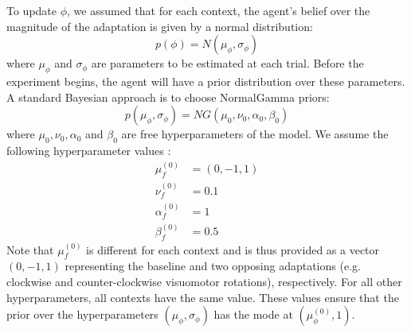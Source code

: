 \documentclass[a4paper,doc,floatsintext,natbib]{apa6}
\begin{document}
To update $\phi$, we assumed that for each context, the agent's belief over
the magnitude of the adaptation is given by a normal distribution:
\begin{equation}
p(\phi) = N(\mu_\phi, \sigma_\phi) \label{eqn:data-dist}
\end{equation}
where $\mu_\phi$ and $\sigma_\phi$ are parameters to be estimated at each
trial. Before the experiment begins, the agent will have a prior distribution
over these parameters. A standard Bayesian approach is to choose NormalGamma
priors:
\begin{equation}
p(\mu_\phi, \sigma_\phi) = NG(\mu_0, \nu_0, \alpha_0, \beta_0)
\end{equation}
where $\mu_0, \nu_0, \alpha_0$ and $\beta_0$ are free hyperparameters of the
model. We assume the following hyperparameter values :
\begin{align} \mu_f^{(0)} &= (0, -1, 1) \\
  \nu_f^{(0)} &= 0.1 \\
  \alpha_f^{(0)} &= 1 \\
  \beta_f^{(0)} &= 0.5
\end{align}
Note that $\mu_f^{(0)}$ is different for each context and is thus provided as a
vector $(0, -1, 1)$ representing the baseline and two opposing adaptations
(e.g. clockwise and counter-clockwise visuomotor rotations), respectively. For
all other hyperparameters, all contexts have the same value. These values
ensure that the prior over the hyperparameters $(\mu_\phi, \sigma_\phi)$ has the mode
at $(\mu_\phi^{(0)}, 1)$.
\end{document}
